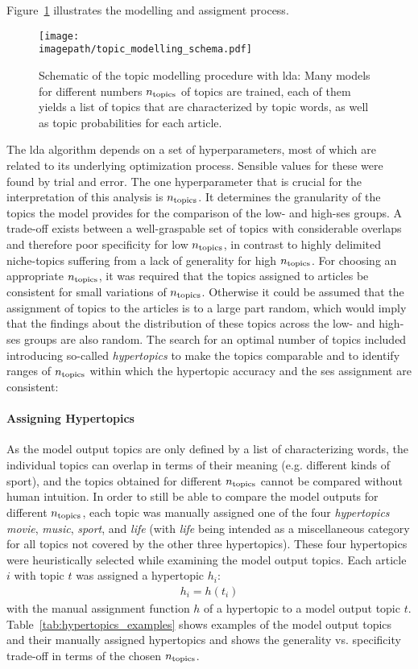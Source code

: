Figure~\ref{fig:topic_modelling_schema} illustrates the modelling and assigment process.
\begin{figure}
    \centering
    \texttt{[image: \\imagepath/topic\_modelling\_schema.pdf]}
    \caption{Schematic of the topic modelling procedure with \gls{lda}: Many models for different numbers $n_\text{topics}$ of topics are trained, each of them yields a list of topics that are characterized by topic words, as well as topic probabilities for each article.}\label{fig:topic_modelling_schema}
\end{figure}

The \gls{lda} algorithm depends on a set of hyperparameters, most of which are related to its underlying optimization process.  Sensible values for these were found by trial and error. The one hyperparameter that is crucial for the interpretation of this analysis is $n_\text{topics}$. It determines the granularity of the topics the model provides for the comparison of the low- and high-\gls{ses} groups. A trade-off exists between a well-graspable set of topics with considerable overlaps and therefore poor specificity for low $n_\text{topics}$, in contrast to highly delimited niche-topics suffering from a lack of generality for high $n_\text{topics}$. For choosing an appropriate $n_\text{topics}$, it was required that the topics assigned to articles be consistent for small variations of $n_\text{topics}$. Otherwise it could be assumed that the assignment of topics to the articles is to a large part random, which would imply that the findings about the distribution of these topics across the low- and high-\gls{ses} groups are also random. The search for an optimal number of topics included introducing so-called \textit{hypertopics} to make the topics comparable and to identify ranges of $n_\text{topics}$ within which the hypertopic accuracy and the \gls{ses} assignment are consistent:

\paragraph{Assigning Hypertopics}
As the model output topics are only defined by a list of characterizing words, the individual topics can overlap in terms of their meaning (e.g. different kinds of sport), and the topics obtained for different $n_\text{topics}$ cannot be compared without human intuition. In order to still be able to compare the model outputs for different $n_\text{topics}$, each topic was manually assigned one of the four \textit{hypertopics} \textit{movie}, \textit{music}, \textit{sport}, and \textit{life} (with \textit{life} being intended as a miscellaneous category for all topics not covered by the other three hypertopics). These four hypertopics were heuristically selected while examining the model output topics. Each article $i$ with topic $t$ was assigned a hypertopic $h_i$:
\begin{align}
    h_i = h(t_i)
\end{align}
with the manual assignment function $h$ of a hypertopic to a model output topic $t$. Table~\ref{tab:hypertopics_examples} shows examples of the model output topics and their manually assigned hypertopics and shows the generality vs. specificity trade-off in terms of the chosen $n_\text{topics}$.

